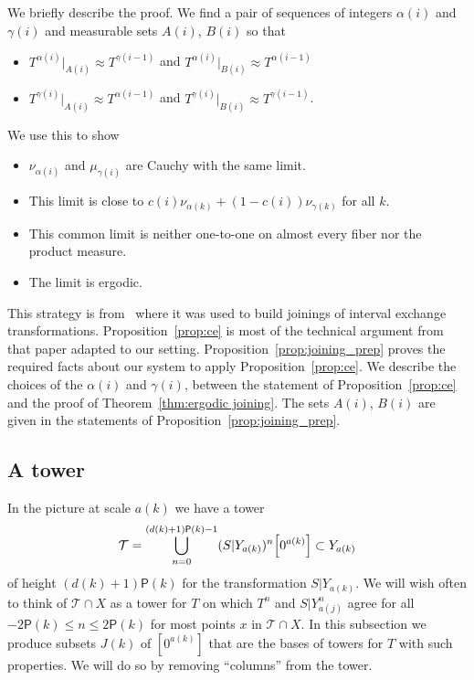 \documentclass[10pt]{amsart}
\theoremstyle{definition}\newtheorem{defi}[theo]{Definition}\newtheorem{rema}[theo]{Remark}\newtheorem{exam}[theo]{Example}\newtheorem{exem}[theo]{Example}\newtheorem{nota}[theo]{Notation}
\renewcommand{\P}{\mathsf{P}}
\newcommand{\clT}{\mathcal{T}}
\let\originalleft\left
\let\originalright\right
\renewcommand{\left}{\mathopen{}\mathclose\bgroup\originalleft}
\renewcommand{\right}{\aftergroup\egroup\originalright}
\begin{document}
We briefly describe the proof. We find a pair of sequences of integers $\alpha(i)$ and $\gamma(i)$ and measurable sets $A(i)$, $B(i)$ so that
\begin{itemize}
\item $T^{\alpha(i)}|_{A(i)}\approx T^{\gamma(i-1)}$ and $T^{\alpha(i)}|_{B(i)} \approx T^{\alpha(i-1)} $
\item $T^{\gamma(i)}|_{A(i)}\approx T^{\alpha(i-1)}$ and $T^{\gamma(i)}|_{B(i)} \approx T^{\gamma(i-1)} $.
\end{itemize}
We use this to show
\begin{itemize}
\item $\nu_{\alpha(i)}$ and $\mu_{\gamma(i)}$ are Cauchy with the same limit.
\item This limit is close to $c(i) \nu_{\alpha(k)}+(1-c(i))\nu_{\gamma(k)}$ for all $k$.
\item This common limit is neither one-to-one on almost every fiber nor the product measure.
\item The limit is ergodic.
\end{itemize}
This strategy is from~\cite{MR4269425} where it was used to build joinings of interval exchange transformations. Proposition~\ref{prop:ce} is most of the technical argument from that paper adapted to our setting. Proposition~\ref{prop:joining_prep} proves the required facts about our system to apply Proposition~\ref{prop:ce}. We describe the choices of the $\alpha(i)$ and $\gamma(i)$, between the statement of Proposition~\ref{prop:ce} and the proof of Theorem~\ref{thm:ergodic joining}. The sets $A(i)$, $B(i)$ are given in the statements of Proposition~\ref{prop:joining_prep}.

\subsection{A tower}\label{subsec:two_toweres}

In the picture at scale $a(k)$ we have a tower
\[
\clT = \bigcup_{n=0}^{(d(k) + 1)\P(k)-1} (S|Y_{a(k)})^n \left[0^{a(k)}\right] \subset Y_{a(k)}
\]
of height $(d(k)+1) \P(k)$ for the transformation $S|Y_{a(k)}$. We will wish often to think of $\clT \cap X$ as a tower for $T$ on which $T^n$ and $S|Y_{a(j)}^n$ agree for all $-2 \P(k) \le n \le 2 \P(k)$ for most points $x$ in $\clT \cap X$. In this subsection we produce subsets $J(k)$ of $[0^{a(k)}]$ that are the bases of towers for $T$ with such properties. We will do so by removing ``columns'' from the tower.
\end{document}
